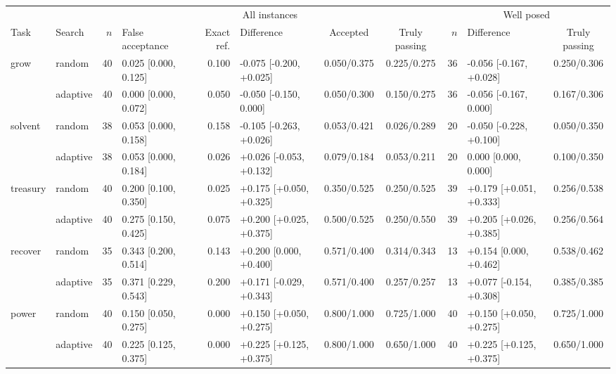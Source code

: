 \setlength{\tabcolsep}{1.5pt}
\begin{tabular*}{\textwidth}{@{\extracolsep{\fill}}llrlrlccrlc@{}}
\toprule
& & \multicolumn{6}{c}{All instances} & \multicolumn{3}{c}{Well posed} \\
\cmidrule(lr){3-8}\cmidrule(l){9-11}
Task & Search & $n$ & False acceptance & Exact ref. & Difference & Accepted & Truly passing & $n$ & Difference & Truly passing \\
\midrule
grow & random & 40 & 0.025 {\tiny[0.000, 0.125]} & 0.100 & \mbox{-}0.075 {\tiny[\mbox{-}0.200, +0.025]} & 0.050/0.375 & 0.225/0.275 & 36 & \mbox{-}0.056 {\tiny[\mbox{-}0.167, +0.028]} & 0.250/0.306 \\
 & adaptive & 40 & 0.000 {\tiny[0.000, 0.072]} & 0.050 & \mbox{-}0.050 {\tiny[\mbox{-}0.150, 0.000]} & 0.050/0.300 & 0.150/0.275 & 36 & \mbox{-}0.056 {\tiny[\mbox{-}0.167, 0.000]} & 0.167/0.306 \\
\addlinespace[2pt]
solvent & random & 38 & 0.053 {\tiny[0.000, 0.158]} & 0.158 & \mbox{-}0.105 {\tiny[\mbox{-}0.263, +0.026]} & 0.053/0.421 & 0.026/0.289 & 20 & \mbox{-}0.050 {\tiny[\mbox{-}0.228, +0.100]} & 0.050/0.350 \\
 & adaptive & 38 & 0.053 {\tiny[0.000, 0.184]} & 0.026 & +0.026 {\tiny[\mbox{-}0.053, +0.132]} & 0.079/0.184 & 0.053/0.211 & 20 & 0.000 {\tiny[0.000, 0.000]} & 0.100/0.350 \\
\addlinespace[2pt]
treasury & random & 40 & 0.200 {\tiny[0.100, 0.350]} & 0.025 & +0.175 {\tiny[+0.050, +0.325]} & 0.350/0.525 & 0.250/0.525 & 39 & +0.179 {\tiny[+0.051, +0.333]} & 0.256/0.538 \\
 & adaptive & 40 & 0.275 {\tiny[0.150, 0.425]} & 0.075 & +0.200 {\tiny[+0.025, +0.375]} & 0.500/0.525 & 0.250/0.550 & 39 & +0.205 {\tiny[+0.026, +0.385]} & 0.256/0.564 \\
\addlinespace[2pt]
recover & random & 35 & 0.343 {\tiny[0.200, 0.514]} & 0.143 & +0.200 {\tiny[0.000, +0.400]} & 0.571/0.400 & 0.314/0.343 & 13 & +0.154 {\tiny[0.000, +0.462]} & 0.538/0.462 \\
 & adaptive & 35 & 0.371 {\tiny[0.229, 0.543]} & 0.200 & +0.171 {\tiny[\mbox{-}0.029, +0.343]} & 0.571/0.400 & 0.257/0.257 & 13 & +0.077 {\tiny[\mbox{-}0.154, +0.308]} & 0.385/0.385 \\
\addlinespace[2pt]
power & random & 40 & 0.150 {\tiny[0.050, 0.275]} & 0.000 & +0.150 {\tiny[+0.050, +0.275]} & 0.800/1.000 & 0.725/1.000 & 40 & +0.150 {\tiny[+0.050, +0.275]} & 0.725/1.000 \\
 & adaptive & 40 & 0.225 {\tiny[0.125, 0.375]} & 0.000 & +0.225 {\tiny[+0.125, +0.375]} & 0.800/1.000 & 0.650/1.000 & 40 & +0.225 {\tiny[+0.125, +0.375]} & 0.650/1.000 \\
\bottomrule
\end{tabular*}
